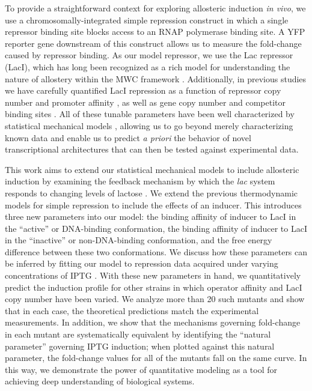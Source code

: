 To provide a straightforward context for exploring allosteric induction \textit{in vivo}, we use a chromosomally-integrated simple repression construct in which a single repressor binding site blocks access to an RNAP polymerase binding site. A YFP reporter gene downstream of this construct allows us to measure the fold-change caused by repressor binding. As our model repressor, we use the Lac repressor (LacI), which has long been recognized as a rich model  for understanding the nature of allostery within the MWC framework \cite{Daly1986, Dunaway1980, Meyer2013, Daber2007, Daber2009, Muller-Hartmann1996, OGorman1980, Sharp2011, Taraban2008, Wilson2007}. Additionally, in previous studies we have carefully quantified LacI repression as a function of repressor copy number and promoter
affinity \cite{Garcia2011}, as well as gene copy number and competitor binding
sites \cite{Weinert2014}. All of these tunable parameters have been well
characterized by statistical mechanical models \cite{Bintu2005a, Bintu2005b}, allowing us to go beyond merely characterizing known data
and enable us to predict \textit{a priori} the behavior of novel transcriptional
architectures that can then be tested against experimental data.

This work aims to extend our statistical mechanical models to include
allosteric induction by examining the
feedback mechanism by which the \textit{lac} system responds to changing levels
of lactose \cite{JACOB1961}. We extend the previous thermodynamic models for
simple repression to include the effects of an inducer. This introduces three
new parameters into our model: the binding affinity of inducer to LacI in the
``active'' or DNA-binding conformation, the binding affinity of inducer to LacI
in the ``inactive'' or non-DNA-binding conformation, and the free energy
difference between these two conformations. We discuss how these parameters can
be inferred by fitting our model to repression data acquired under varying
concentrations of IPTG . With these new parameters in hand, we quantitatively
predict the induction profile for other strains in which operator affinity and
LacI copy number have been varied. We analyze more than 20 such mutants and show
that in each case, the theoretical predictions match the experimental
measurements. In addition, we show that the mechanisms governing fold-change in
each mutant are systematically equivalent by identifying the ``natural
parameter'' governing IPTG induction; when plotted against this natural
parameter, the fold-change values for all of the mutants fall on the same curve.
In this way, we demonstrate the power of quantitative modeling as a tool for
achieving deep understanding of biological systems. 
